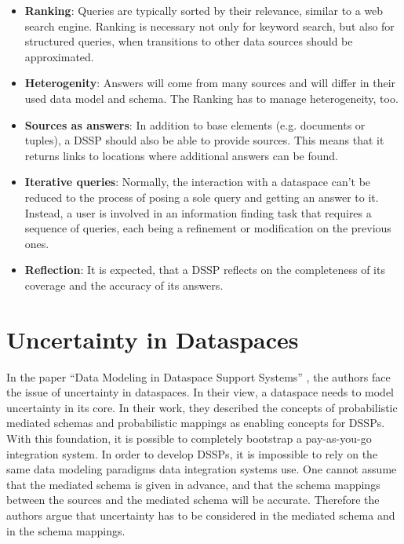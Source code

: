 \begin{itemize}
\item \textbf{Ranking}: Queries are typically sorted by their relevance, similar to a web search engine. Ranking is necessary not only for keyword search, but also for structured queries, when transitions to other data sources should be approximated.  

\item \textbf{Heterogenity}: Answers will come from many sources and will differ in their used data model and schema. The Ranking has to manage heterogeneity, too.

\item \textbf{Sources as answers}: In addition to base elements (e.g. documents or tuples), a DSSP should also be able to provide sources. This means that it returns links to locations where additional answers can be found.

\item \textbf{Iterative queries}: Normally, the interaction with a dataspace can't be reduced to the process of posing  a sole query and getting an answer to it. Instead, a user is involved in an information finding task that requires a sequence of queries, each being a refinement or modification on the previous ones.

\item \textbf{Reflection}: It is expected, that a DSSP reflects on the completeness of its coverage and the accuracy of its answers. 
\end{itemize}


\section{Uncertainty in Dataspaces}
 
In the paper ``Data Modeling in Dataspace Support Systems'' \cite{DBLP:conf/birthday/SarmaDH09}, the authors face the issue of uncertainty in dataspaces. In their view, a dataspace needs to model uncertainty in its core. In their work, they described the concepts of probabilistic mediated schemas and probabilistic mappings as enabling concepts for DSSPs. With this foundation, it is possible to completely bootstrap a pay-as-you-go integration system. 
In order to develop DSSPs, it is impossible to rely on the same data modeling paradigms data integration systems use. 
One cannot assume that the mediated schema is given in advance, and that the schema mappings between the sources and the mediated schema will be accurate. Therefore the authors argue that uncertainty has to be considered in the mediated schema and in the schema mappings.

